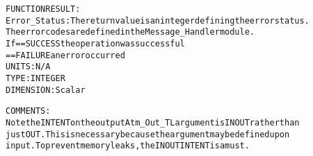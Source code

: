 \begin{alltt}
  FUNCTION RESULT:
        Error_Status:    The return value is an integer defining the error status.
                         The error codes are defined in the Message_Handler module.
                         If == SUCCESS the operation was successful
                            == FAILURE an error occurred
                         UNITS:      N/A
                         TYPE:       INTEGER
                         DIMENSION:  Scalar
 
  COMMENTS:
        Note the INTENT on the output Atm_Out_TL argument is IN OUT rather than
        just OUT. This is necessary because the argument may be defined upon
        input. To prevent memory leaks, the IN OUT INTENT is a must.
 
  \end{alltt}
